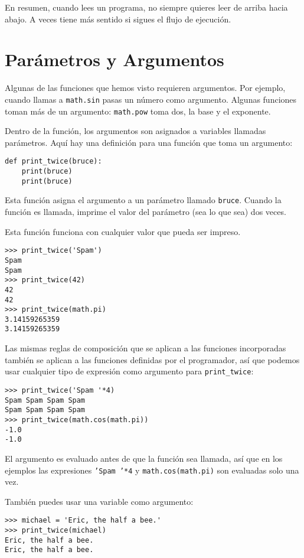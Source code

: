 \documentclass[12pt,letterpaper]{book}
\begin{document}
En resumen, cuando lees un programa, no siempre quieres leer de arriba hacia abajo. A veces tiene más sentido si sigues el flujo de ejecución.

\section{Parámetros y Argumentos}

Algunas de las funciones que hemos visto requieren argumentos. Por ejemplo, cuando llamas a \texttt{math.sin} pasas un número como argumento. Algunas funciones toman más de un argumento: \texttt{math.pow} toma dos, la base y el exponente.

Dentro de la función, los argumentos son asignados a variables llamadas parámetros. Aquí hay una definición para una función que toma un argumento:

\begin{lstlisting}
def print_twice(bruce):
    print(bruce)
    print(bruce)
\end{lstlisting}

Esta función asigna el argumento a un parámetro llamado \texttt{bruce}. Cuando la función es llamada, imprime el valor del parámetro (sea lo que sea) dos veces.

Esta función funciona con cualquier valor que pueda ser impreso.

\begin{lstlisting}
>>> print_twice('Spam')
Spam
Spam
>>> print_twice(42)
42
42
>>> print_twice(math.pi)
3.14159265359
3.14159265359
\end{lstlisting}

Las mismas reglas de composición que se aplican a las funciones incorporadas también se aplican a las funciones definidas por el programador, así que podemos usar cualquier tipo de expresión como argumento para \texttt{print\_twice}:

\begin{lstlisting}
>>> print_twice('Spam '*4)
Spam Spam Spam Spam 
Spam Spam Spam Spam 
>>> print_twice(math.cos(math.pi))
-1.0
-1.0
\end{lstlisting}

El argumento es evaluado antes de que la función sea llamada, así que en los ejemplos las expresiones \texttt{'Spam '*4} y \texttt{math.cos(math.pi)} son evaluadas solo una vez.

También puedes usar una variable como argumento:

\begin{lstlisting}
>>> michael = 'Eric, the half a bee.'
>>> print_twice(michael)
Eric, the half a bee.
Eric, the half a bee.
\end{lstlisting}
\end{document}
